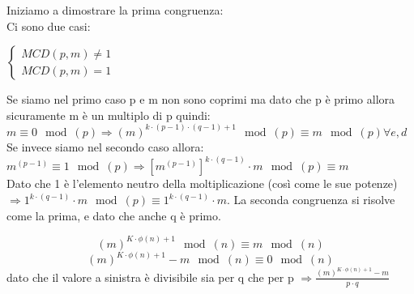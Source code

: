 \documentclass[10pt,a4paper]{article}
\begin{document}
Iniziamo a dimostrare la prima congruenza:\\
Ci sono due casi:
\begin{center}
$\begin{cases}
MCD(p,m)\not=1\\
MCD(p,m)=1
\end{cases}
$\\
\end{center}
Se siamo nel primo caso p e m non sono coprimi ma dato che p è primo allora sicuramente m è un multiplo di p quindi:\\
$m\equiv 0 \mod(p) \Rightarrow (m)^{k\cdot(p-1)\cdot(q-1)+1}\mod(p)\equiv m \mod(p)  \forall e,d$\\
Se invece siamo nel secondo caso allora:\\
$m^{(p-1)} \equiv 1 \mod(p) \Rightarrow [m^{(p-1)}]^{k\cdot (q-1)}\cdot m \mod(p) \equiv m $ \\Dato che 1 è l'elemento neutro della moltiplicazione (così come le sue potenze) $ \Rightarrow 1^{k\cdot (q-1)}\cdot m \mod(p) \equiv 1^{k\cdot(q-1)}\cdot m$. La seconda congruenza si risolve come la prima, e dato che anche q è primo.

$$(m)^{K \cdot \phi(n)+1}\mod(n) \equiv m \mod(n) $$
$$(m)^{K \cdot \phi(n)+1} - m\mod(n) \equiv 0 \mod(n)$$
dato che il valore a sinistra è divisibile sia per q che per p $\Rightarrow \frac{(m)^{K \cdot \phi(n)+1} - m}{p\cdot q}$
\end{document}
